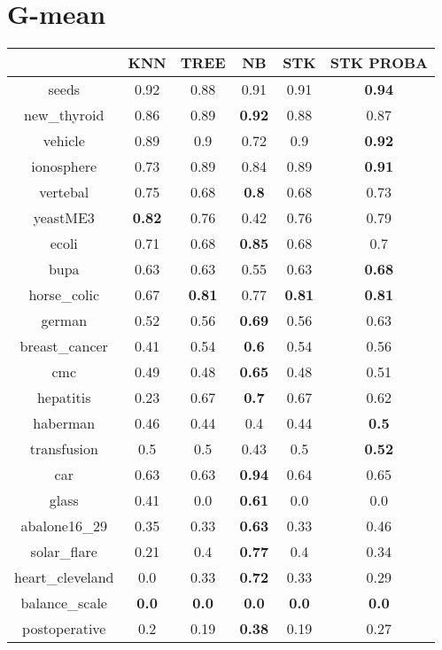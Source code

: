 \documentclass{article}%
\begin{document}
\section*{G{-}mean}%
\begin{tabular}{c|ccccc}%
&KNN&TREE&NB&STK&STK PROBA\\%
\hline%
seeds&0.92&0.88&0.91&0.91&\textbf{0.94}\\%
new\_thyroid&0.86&0.89&\textbf{0.92}&0.88&0.87\\%
vehicle&0.89&0.9&0.72&0.9&\textbf{0.92}\\%
ionosphere&0.73&0.89&0.84&0.89&\textbf{0.91}\\%
vertebal&0.75&0.68&\textbf{0.8}&0.68&0.73\\%
yeastME3&\textbf{0.82}&0.76&0.42&0.76&0.79\\%
ecoli&0.71&0.68&\textbf{0.85}&0.68&0.7\\%
bupa&0.63&0.63&0.55&0.63&\textbf{0.68}\\%
horse\_colic&0.67&\textbf{0.81}&0.77&\textbf{0.81}&\textbf{0.81}\\%
german&0.52&0.56&\textbf{0.69}&0.56&0.63\\%
breast\_cancer&0.41&0.54&\textbf{0.6}&0.54&0.56\\%
cmc&0.49&0.48&\textbf{0.65}&0.48&0.51\\%
hepatitis&0.23&0.67&\textbf{0.7}&0.67&0.62\\%
haberman&0.46&0.44&0.4&0.44&\textbf{0.5}\\%
transfusion&0.5&0.5&0.43&0.5&\textbf{0.52}\\%
car&0.63&0.63&\textbf{0.94}&0.64&0.65\\%
glass&0.41&0.0&\textbf{0.61}&0.0&0.0\\%
abalone16\_29&0.35&0.33&\textbf{0.63}&0.33&0.46\\%
solar\_flare&0.21&0.4&\textbf{0.77}&0.4&0.34\\%
heart\_cleveland&0.0&0.33&\textbf{0.72}&0.33&0.29\\%
balance\_scale&\textbf{0.0}&\textbf{0.0}&\textbf{0.0}&\textbf{0.0}&\textbf{0.0}\\%
postoperative&0.2&0.19&\textbf{0.38}&0.19&0.27\\%
\end{tabular}

%
\end{document}
